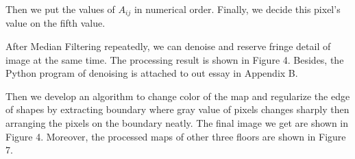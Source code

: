 \documentclass{mcmthesis}
\begin{document}
Then we put the values of $A_{ij}$ in numerical order. Finally, we decide this pixel's value on the fifth value. 

After Median Filtering repeatedly, we can denoise and reserve fringe detail of image at the same time. The processing result is shown in Figure 4. Besides, the Python program of denoising is attached to out essay in Appendix B. 

Then we develop an algorithm to change color of the map and regularize the edge of shapes by extracting boundary where gray value of pixels changes sharply then arranging the pixels on the boundary neatly. The final image we get are shown in Figure 4. Moreover, the processed maps of other three floors are shown in Figure 7.

\begin{figure}[H]


\end{figure}
\end{document}
